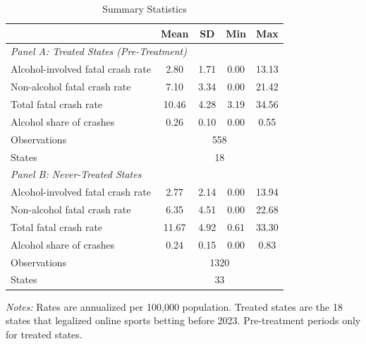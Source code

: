 \begin{table}[t]
\centering
\caption{Summary Statistics}
\label{tab:summary}
\begin{tabular}{lcccc}
\toprule
 & Mean & SD & Min & Max \\
\midrule
\multicolumn{5}{l}{\textit{Panel A: Treated States (Pre-Treatment)}} \\
Alcohol-involved fatal crash rate & 2.80 & 1.71 & 0.00 & 13.13
 \\
Non-alcohol fatal crash rate & 7.10 & 3.34 & 0.00 & 21.42
 \\
Total fatal crash rate & 10.46 & 4.28 & 3.19 & 34.56
 \\
Alcohol share of crashes & 0.26 & 0.10 & 0.00 & 0.55
 \\
Observations & \multicolumn{4}{c}{558} \\
States & \multicolumn{4}{c}{18} \\
\midrule
\multicolumn{5}{l}{\textit{Panel B: Never-Treated States}} \\
Alcohol-involved fatal crash rate & 2.77 & 2.14 & 0.00 & 13.94
 \\
Non-alcohol fatal crash rate & 6.35 & 4.51 & 0.00 & 22.68
 \\
Total fatal crash rate & 11.67 & 4.92 & 0.61 & 33.30
 \\
Alcohol share of crashes & 0.24 & 0.15 & 0.00 & 0.83
 \\
Observations & \multicolumn{4}{c}{1320} \\
States & \multicolumn{4}{c}{33} \\
\bottomrule
\end{tabular}
\begin{tablenotes}
\small
\item \textit{Notes:} Rates are annualized per 100,000 population. Treated states are the 18 states that legalized online sports betting before 2023. Pre-treatment periods only for treated states.
\end{tablenotes}
\end{table}
